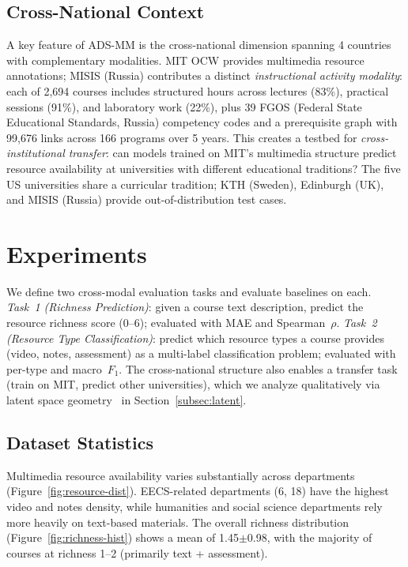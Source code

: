 \documentclass[sigconf,review]{acmart}
\newcommand{\NumCountries}{4}
\newcommand{\NumMISIS}{2,694}
\newcommand{\MISISPrograms}{166}
\newcommand{\MISISYears}{5}
\newcommand{\MISISPrereqLinks}{99,676}
\newcommand{\MISISCompetencies}{39}
\newcommand{\MeanRichness}{1.45}          %
\newcommand{\StdRichness}{0.98}           %
\newcommand{\ADSMM}{\textsc{ADS-MM}\xspace}
\begin{document}
\subsection{Cross-National Context}
\label{subsec:cross-national}

A key feature of \ADSMM is the cross-national dimension spanning {\NumCountries} countries with complementary modalities.
MIT OCW provides multimedia resource annotations; MISIS (Russia) contributes a distinct \emph{instructional activity modality}: each of {\NumMISIS} courses includes structured hours across lectures (83\%), practical sessions (91\%), and laboratory work (22\%), plus {\MISISCompetencies} FGOS (Federal State Educational Standards, Russia) competency codes and a prerequisite graph with {\MISISPrereqLinks} links across {\MISISPrograms} programs over {\MISISYears} years.
This creates a testbed for \emph{cross-institutional transfer}: can models trained on MIT's multimedia structure predict resource availability at universities with different educational traditions?
The five US universities share a curricular tradition; KTH (Sweden), Edinburgh (UK), and MISIS (Russia) provide out-of-distribution test cases.


\section{Experiments}
\label{sec:experiments}

We define two cross-modal evaluation tasks and evaluate baselines on each.
\emph{Task~1 (Richness Prediction)}: given a course text description, predict the resource richness score (0--6); evaluated with MAE and Spearman~$\rho$.
\emph{Task~2 (Resource Type Classification)}: predict which resource types a course provides (video, notes, assessment) as a multi-label classification problem; evaluated with per-type and macro~$F_1$.
The cross-national structure also enables a transfer task (train on MIT, predict other universities), which we analyze qualitatively via latent space geometry~\cite{shi2024mllmedu} in Section~\ref{subsec:latent}.

\subsection{Dataset Statistics}

Multimedia resource availability varies substantially across departments (Figure~\ref{fig:resource-dist}).
EECS-related departments (6, 18) have the highest video and notes density, while humanities and social science departments rely more heavily on text-based materials.
The overall richness distribution (Figure~\ref{fig:richness-hist}) shows a mean of {\MeanRichness}$\pm${\StdRichness}, with the majority of courses at richness 1--2 (primarily text + assessment).
\end{document}
